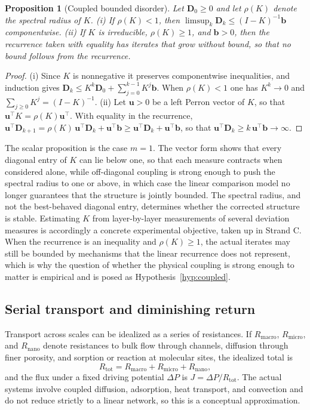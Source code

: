 \documentclass[11pt]{article}
\newtheorem{proposition}{Proposition}
\theoremstyle{definition}
\begin{document}
\begin{proposition}[Coupled bounded disorder]
\label{prop:coupled}
Let $\mathbf{D}_0\ge 0$ and let $\rho(K)$ denote the spectral radius of $K$. (i) If $\rho(K)<1$, then $\limsup_k \mathbf{D}_k\le (I-K)^{-1}\mathbf{b}$ componentwise. (ii) If $K$ is irreducible, $\rho(K)\ge 1$, and $\mathbf{b}>0$, then the recurrence taken with equality has iterates that grow without bound, so that no bound follows from the recurrence.
\end{proposition}

\begin{proof}
(i) Since $K$ is nonnegative it preserves componentwise inequalities, and induction gives $\mathbf{D}_k\le K^k\mathbf{D}_0+\sum_{j=0}^{k-1}K^j\mathbf{b}$. When $\rho(K)<1$ one has $K^k\to 0$ and $\sum_{j\ge 0}K^j=(I-K)^{-1}$. (ii) Let $\mathbf{u}>0$ be a left Perron vector of $K$, so that $\mathbf{u}^{\top}K=\rho(K)\mathbf{u}^{\top}$. With equality in the recurrence, $\mathbf{u}^{\top}\mathbf{D}_{k+1}=\rho(K)\,\mathbf{u}^{\top}\mathbf{D}_k+\mathbf{u}^{\top}\mathbf{b}\ge \mathbf{u}^{\top}\mathbf{D}_k+\mathbf{u}^{\top}\mathbf{b}$, so that $\mathbf{u}^{\top}\mathbf{D}_k\ge k\,\mathbf{u}^{\top}\mathbf{b}\to\infty$. \qedhere
\end{proof}

The scalar proposition is the case $m=1$. The vector form shows that every diagonal entry of $K$ can lie below one, so that each measure contracts when considered alone, while off-diagonal coupling is strong enough to push the spectral radius to one or above, in which case the linear comparison model no longer guarantees that the structure is jointly bounded. The spectral radius, and not the best-behaved diagonal entry, determines whether the corrected structure is stable. Estimating $K$ from layer-by-layer measurements of several deviation measures is accordingly a concrete experimental objective, taken up in Strand C. When the recurrence is an inequality and $\rho(K)\ge 1$, the actual iterates may still be bounded by mechanisms that the linear recurrence does not represent, which is why the question of whether the physical coupling is strong enough to matter is empirical and is posed as Hypothesis~\ref{hyp:coupled}.

\subsection{Serial transport and diminishing return}

Transport across scales can be idealized as a series of resistances. If $R_{\mathrm{macro}}$, $R_{\mathrm{micro}}$, and $R_{\mathrm{nano}}$ denote resistances to bulk flow through channels, diffusion through finer porosity, and sorption or reaction at molecular sites, the idealized total is
\begin{equation}
R_{\mathrm{tot}}=R_{\mathrm{macro}}+R_{\mathrm{micro}}+R_{\mathrm{nano}},
\end{equation}
and the flux under a fixed driving potential $\Delta P$ is $J=\Delta P/R_{\mathrm{tot}}$. The actual systems involve coupled diffusion, adsorption, heat transport, and convection and do not reduce strictly to a linear network, so this is a conceptual approximation.
\end{document}
